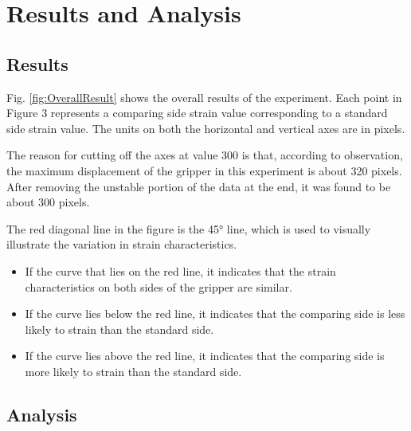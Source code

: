 \documentclass[conference]{IEEEtran}
\begin{document}
\FloatBarrier


\section{Results and Analysis}

\label{results}

\subsection{Results}



Fig. \ref{fig:OverallResult} shows the overall results of the experiment. Each point in Figure 3 represents a comparing side strain value corresponding to a standard side strain value. The units on both the horizontal and vertical axes are in pixels. 

The reason for cutting off the axes at value 300 is that, according to observation, the maximum displacement of the gripper in this experiment is about 320 pixels. After removing the unstable portion of the data at the end, it was found to be about 300 pixels.



The red diagonal line in the figure is the 45° line, which is used to visually illustrate the variation in strain characteristics. 
\begin{itemize}
    \item If the curve that lies on the red line, it indicates that the strain characteristics on both sides of the gripper are similar. 
    \item If the curve lies below the red line, it indicates that the comparing side is less likely to strain than the standard side.
    \item If the curve lies above the red line, it indicates that the comparing side is more likely to strain than the standard side.
\end{itemize}


\subsection{Analysis}
\label{Analysis}
\end{document}
